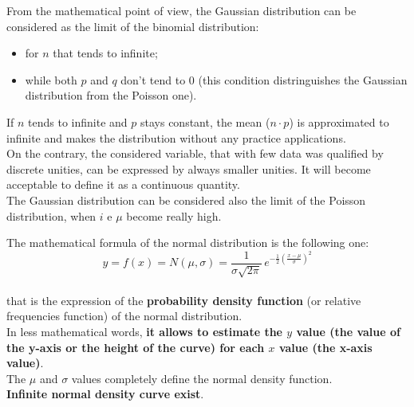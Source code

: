 \begin{frame}
  \vspace*{.25cm}
  From the mathematical point of view, the Gaussian distribution can be considered as the limit of the binomial distribution:\\
  \begin{itemize}
    \item for $ n $ that tends to infinite;
    \item while both $ p $ and $ q $ don't tend to 0 (this condition distringuishes the Gaussian distribution from the Poisson one).
  \end{itemize}
  \vspace*{.25cm}
  If $ n $ tends to infinite and $ p $ stays constant, the mean ($ n \cdot p $) is approximated to infinite and makes the distribution without any practice applications.\\
  \vspace*{.25cm}
  On the contrary, the considered variable, that with few data was qualified by discrete unities, can be expressed by always smaller unities. It will become acceptable to define it as a continuous quantity.\\
  The Gaussian distribution can be considered also the limit of the Poisson distribution, when $ i $ e $ \mu $ become really high.
\end{frame}

\begin{frame}
  \vspace*{.25cm}
  The mathematical formula of the normal distribution is the following one:
  \vspace*{.25cm}
  $$ y = f(x) = N(\mu,\sigma) = \frac{1}{\sigma \sqrt{2\pi}}\, e^{-\frac{1}{2} \left( \frac{x-\mu}{\sigma} \right) ^2} $$ \\
  \vspace*{.25cm}
  that is the expression of the \textbf{probability density function} (or relative frequencies function) of the normal distribution.\\
  \vspace*{.25cm}
  In less mathematical words, \textbf{it allows to estimate the $ y $ value (the value of the y-axis or the height of the curve) for each $ x $ value (the x-axis value)}.\\
  \vspace*{.25cm}
  The $ \mu $ and $ \sigma $ values completely define the normal density function.\\
  \vspace*{.25cm}
  \textbf{Infinite normal density curve exist}.
\end{frame}

